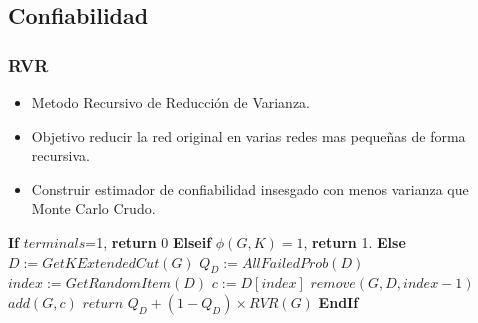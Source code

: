 \subsection{Confiabilidad}
\begin{frame}\frametitle{RVR}
\begin{block}{}
\begin{scriptsize}
\begin{itemize}
 \item Metodo Recursivo de Reducción de Varianza.
 \item Objetivo reducir la red original en varias redes mas pequeñas de forma recursiva.
 \item Construir estimador de confiabilidad insesgado con menos varianza que Monte Carlo Crudo.
\end{itemize} 
\end{scriptsize}
\end{block}
\begin{block}{}
\begin{algorithm}[H]
\caption{$RVR(G,K,p_v,p_e)$}
\begin{algorithmic}[1]
\begin{tiny}
\STATE \textbf{If} $terminals$=1, \textbf{return} $0$
\STATE \textbf{Elseif} $\phi(G,K)=1$, \textbf{return} 1.
\STATE \textbf{Else} 
\STATE $D := GetKExtendedCut(G)$
\STATE $Q_{D} := AllFailedProb(D)$
\STATE $index := GetRandomItem(D)$
\STATE $c := D[index]$
\STATE $remove(G,D, index - 1)$
\STATE $add(G, c)$
\STATE $return \, \, Q_{D} + (1 - Q_{D})\times RVR(G)$
\STATE \textbf{EndIf}
\end{tiny}
\end{algorithmic}
\end{algorithm}
\end{block}
\end{frame}



